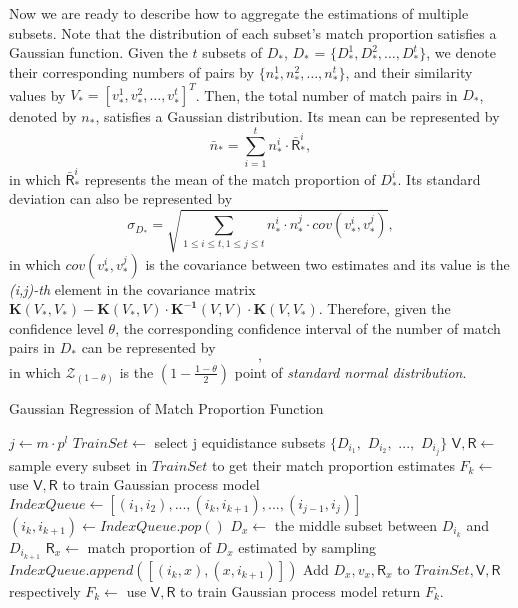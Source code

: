  Now we are ready to describe how to aggregate the estimations of multiple subsets. Note that the distribution of each subset's match proportion satisfies a Gaussian function. Given the $t$ subsets of $D_*$, $D_*$ = $\{D_*^1,D_*^2,\ldots,D_*^t\}$, we denote their corresponding numbers of pairs by $\{n_*^1, n_*^2,\ldots, n_*^t\}$, and their similarity values by $V_*=[v_*^1, v_*^2, \ldots, v_*^t]^T$. Then, the total number of match pairs in $D_*$, denoted by $n_*$, satisfies a Gaussian distribution. Its mean can be represented by
\begin{equation}
  \bar{n}_* = \sum_{i=1}^{t}n_*^i\cdot\bar{\mathsf{R}}_*^i,
\end{equation}
in which $\bar{\mathsf{R}}_*^i$ represents the mean of the match proportion of $D_*^i$. Its standard deviation can also be represented by
\begin{equation}
  \sigma_{D_*} = \sqrt{\sum_{1\leq i\leq t,1\leq j\leq t}n_*^i\cdot n_*^j\cdot cov(v_*^i, v_*^j)},
\end{equation}
in which $cov(v_*^i, v_*^j)$ is the covariance between two estimates and its value is the {\em (i,j)-th} element in the covariance matrix $\mathbf{K}(V_*,V_*)-\mathbf{K}(V_*,V)\cdot\mathbf{K^{-1}}(V,V)\cdot\mathbf{K}(V,V_*)$. Therefore, given the confidence level $\theta$, the corresponding confidence interval of the number of match pairs in $D_*$ can be represented by
\begin{equation}
  [\bar{n}_* - \mathcal{Z}_{(1-\theta)} \cdot \sigma_{D_*}, \bar{n}_* + \mathcal{Z}_{(1-\theta)} \cdot \sigma_{D_*}],
\label{eq:gpr:confidenceintervals}
\end{equation}
in which $\mathcal{Z}_{(1-\theta)}$ is the $(1-\frac{1-\theta}{2})$ point of {\em standard normal distribution}.


\begin{algorithm}
\setlength{\textfloatsep}{0pt}
\caption{Gaussian Regression of Match Proportion Function}
\label{alg:fit-gp}
$j \gets m\cdot p^l$\;
$TrainSet \gets$ select j equidistance subsets $\{D_{i_1},$ $D_{i_2},$ $...,$ $D_{i_j}\}$\;
$\mathsf{V}, \mathsf{R} \gets$ sample every subset in $TrainSet$ to get their match proportion estimates\;
$F_k \gets$ use $\mathsf{V}, \mathsf{R}$ to train Gaussian process model\;
$IndexQueue \gets [(i_1, i_2), ..., (i_k, i_{k+1}), ..., (i_{j-1}, i_j)]$\;
{
    $(i_k, i_{k+1}) \gets IndexQueue.pop()$\;
    $D_x \gets$ the middle subset between $D_{i_k}$ and $D_{i_{k+1}}$\;
    $\mathsf{R}_x \gets$ match proportion of $D_x$ estimated by sampling\;
    {
        $IndexQueue.append([(i_k, x),(x, i_{k+1})])$\;
    }
    Add $D_x, v_x, \mathsf{R}_x$ to $TrainSet, \mathsf{V}, \mathsf{R}$ respectively\;
    $F_k \gets$ use $\mathsf{V}, \mathsf{R}$ to train Gaussian process model\;
}
return $F_k$.
\end{algorithm}

